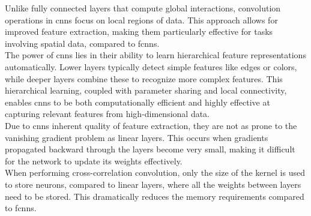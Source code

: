 Unlike fully connected layers that compute global interactions, convolution operations in \acrshort{cnn}s focus on local regions of data. This approach allows for improved feature extraction, making them particularly effective for tasks involving spatial data, compared to \acrshort{fcnn}s. \\

The power of \acrshort{cnn}s lies in their ability to learn hierarchical feature representations automatically. Lower layers typically detect simple features like edges or colors, while deeper layers combine these to recognize more complex features. This hierarchical learning, coupled with parameter sharing and local connectivity, enables \acrshort{cnn}s to be both computationally efficient and highly effective at capturing relevant features from high-dimensional data. \\
Due to \acrshort{cnn}s inherent quality of feature extraction, they are not as prone to the vanishing gradient problem \cite{tan2019vanishing} as linear layers. This occurs when gradients propagated backward through the layers become very small, making it difficult for the network to update its weights effectively. \\
When performing cross-correlation convolution, only the size of the kernel is used to store neurons, compared to linear layers, where all the weights between layers need to be stored. This dramatically reduces the memory requirements compared to \acrshort{fcnn}s.

